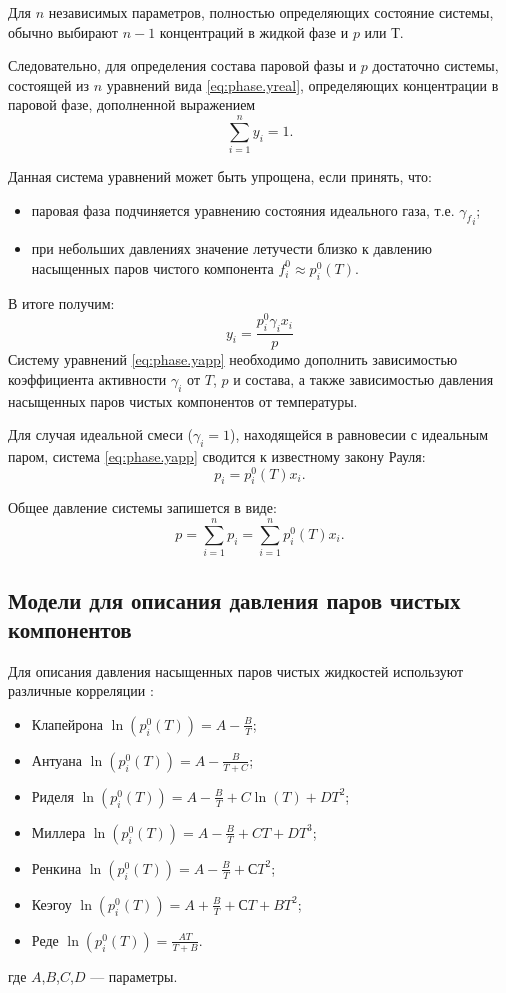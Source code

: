 Для $n$ независимых параметров, полностью определяющих состояние системы, обычно выбирают $n-1$ концентраций в жидкой фазе и $p$ или $Т$.

Следовательно, для определения состава паровой	 фазы и $p$ достаточно системы, состоящей из $n$ уравнений вида \eqref{eq:phase.yreal}, определяющих концентрации в паровой фазе, дополненной выражением
\begin{equation}
	\sum\limits_{i=1}^{n} y_i =1.
\end{equation}

Данная система уравнений может быть упрощена, если принять, что:
\begin{itemize}
	\item паровая фаза подчиняется  уравнению состояния идеального газа, т.е. ${\gamma_f}_i$;
	\item при небольших давлениях значение летучести близко к давлению насыщенных паров чистого компонента $f_i^0 \approx p^0_i (T)$.
\end{itemize}
В итоге получим:
\begin{equation} \label{eq:phase.yapp}
y_i=\dfrac{p_i^0 \gamma_i x_i}{ p}
\end{equation}
Систему уравнений \eqref{eq:phase.yapp} необходимо дополнить зависимостью коэффициента активности $\gamma_i$ от $T$, $p$ и состава, а также зависимостью давления насыщенных паров чистых компонентов от температуры. 

Для случая идеальной смеси ($\gamma_i=1$), находящейся в равновесии с идеальным паром, система \eqref{eq:phase.yapp} сводится к известному закону Рауля:
\begin{equation}
	p_i=p_i^0(T) x_i.
\end{equation}

Общее давление системы запишется в виде:
\begin{equation}
	p=\sum\limits_{i=1}^{n} p_i=  \sum\limits_{i=1}^{n} p_i^0 (T) x_i.
\end{equation}

\subsection*{Модели для описания давления паров чистых компонентов}


Для описания давления насыщенных паров чистых жидкостей используют различные корреляции \cite{yelles1989,rid1982}:
\begin{itemize}
	\item Клапейрона $\ln(p_i^0(T))=A-\frac{B}{T}$;
	\item Антуана $\ln(p_i^0(T))=A-\frac{B}{T+C}$;
	\item Риделя $\ln(p_i^0(T))=A-\frac{B}{T}+C \ln(T)+D T^2$;
	\item Миллера $\ln(p_i^0(T))=A-\frac{B}{T}+C T+D T^3$;
	\item Ренкина $\ln(p_i^0(T))=A-\frac{B}{T}+С T^2$;
	\item Кеэгоу $\ln(p_i^0(T))=A+\frac{B}{T}+С T+BT^2$;
	\item Реде $\ln(p_i^0(T))=\frac{AT}{T+B}$.
\end{itemize}
где $A$,$B$,$C$,$D$ --- параметры.


